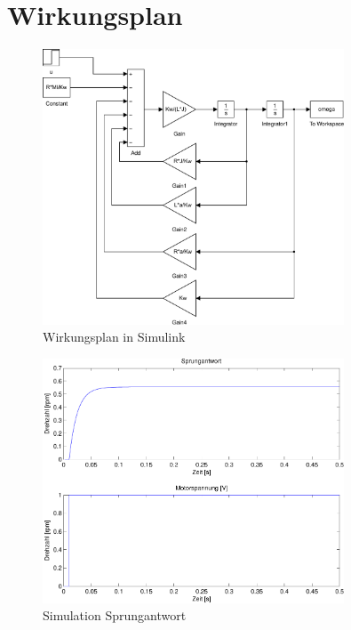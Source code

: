 \section{Wirkungsplan}
\begin{figure}[h!]
    \centering
    \includegraphics[width=0.8\textwidth]{03/wirkungsplan_mdl.pdf}
    \caption{Wirkungsplan in Simulink}
    \label{fig:03_mdl}
\end{figure}
\begin{figure}[h!]
    \centering
    \includegraphics[width=0.8\textwidth]{03/wirkungsplan_plot.pdf}
    \caption{Simulation Sprungantwort}
    \label{fig:03_sim}
\end{figure}


